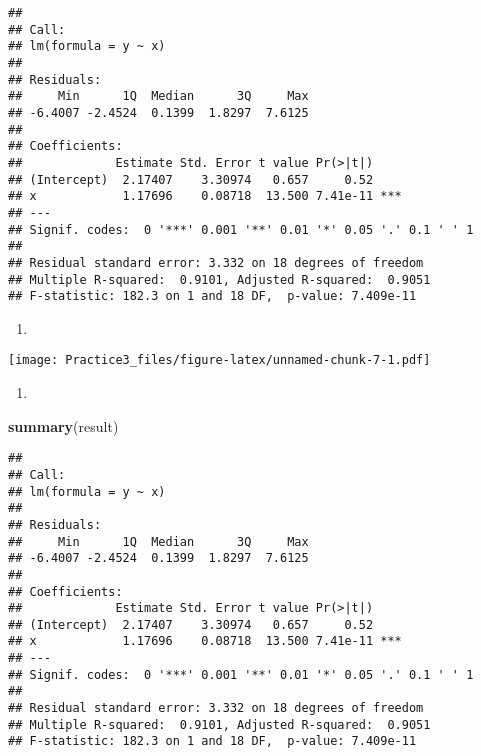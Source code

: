 \documentclass[
]{article}
\newenvironment{Shaded}{\begin{snugshade}}{\end{snugshade}}
\newcommand{\DataTypeTok}[1]{\textcolor[rgb]{0.13,0.29,0.53}{#1}}
\newcommand{\DecValTok}[1]{\textcolor[rgb]{0.00,0.00,0.81}{#1}}
\newcommand{\KeywordTok}[1]{\textcolor[rgb]{0.13,0.29,0.53}{\textbf{#1}}}
\newcommand{\NormalTok}[1]{#1}
\newcommand{\OperatorTok}[1]{\textcolor[rgb]{0.81,0.36,0.00}{\textbf{#1}}}
\begin{document}
\begin{verbatim}
## 
## Call:
## lm(formula = y ~ x)
## 
## Residuals:
##     Min      1Q  Median      3Q     Max 
## -6.4007 -2.4524  0.1399  1.8297  7.6125 
## 
## Coefficients:
##             Estimate Std. Error t value Pr(>|t|)    
## (Intercept)  2.17407    3.30974   0.657     0.52    
## x            1.17696    0.08718  13.500 7.41e-11 ***
## ---
## Signif. codes:  0 '***' 0.001 '**' 0.01 '*' 0.05 '.' 0.1 ' ' 1
## 
## Residual standard error: 3.332 on 18 degrees of freedom
## Multiple R-squared:  0.9101, Adjusted R-squared:  0.9051 
## F-statistic: 182.3 on 1 and 18 DF,  p-value: 7.409e-11
\end{verbatim}

\begin{enumerate}
\def\labelenumi{(\alph{enumi})}
\setcounter{enumi}{3}
\item
\end{enumerate}

\begin{Shaded}
\end{Shaded}

\texttt{[image: Practice3\_files/figure-latex/unnamed-chunk-7-1.pdf]}

\begin{enumerate}
\def\labelenumi{(\alph{enumi})}
\setcounter{enumi}{4}
\item
\end{enumerate}

\begin{Shaded}
\begin{Highlighting}[]
\KeywordTok{summary}\NormalTok{(result)}
\end{Highlighting}
\end{Shaded}

\begin{verbatim}
## 
## Call:
## lm(formula = y ~ x)
## 
## Residuals:
##     Min      1Q  Median      3Q     Max 
## -6.4007 -2.4524  0.1399  1.8297  7.6125 
## 
## Coefficients:
##             Estimate Std. Error t value Pr(>|t|)    
## (Intercept)  2.17407    3.30974   0.657     0.52    
## x            1.17696    0.08718  13.500 7.41e-11 ***
## ---
## Signif. codes:  0 '***' 0.001 '**' 0.01 '*' 0.05 '.' 0.1 ' ' 1
## 
## Residual standard error: 3.332 on 18 degrees of freedom
## Multiple R-squared:  0.9101, Adjusted R-squared:  0.9051 
## F-statistic: 182.3 on 1 and 18 DF,  p-value: 7.409e-11
\end{verbatim}
\end{document}
